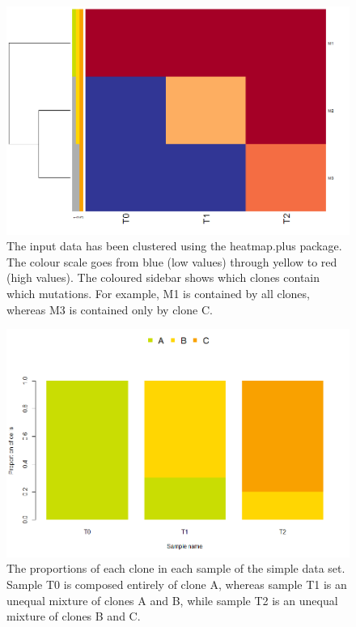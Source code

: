 \documentclass[a4paper]{article}\usepackage[]{graphicx}\usepackage[]{color}
\begin{document}
\begin{figure}[H]
   \centering
       \includegraphics[width=\textwidth]{gaga_simple_data_heatmap}
   \caption{The input data has been clustered using the heatmap.plus package.  The colour scale goes from blue (low values) through yellow to red (high values).
   The coloured sidebar shows which clones contain which mutations.  For example, M1 is contained by all clones, whereas M3 is contained only by clone C.}
\end{figure}

\begin{figure}[H]
   \centering
       \includegraphics[width=\textwidth]{gaga_simple_data_proportions}
   \caption{The proportions of each clone in each sample of the simple data set.  Sample T0 is composed entirely of clone A, whereas sample T1 is an unequal mixture of 
   clones A and B, while sample T2 is an unequal mixture of clones B and C.}
\end{figure}
\end{document}
